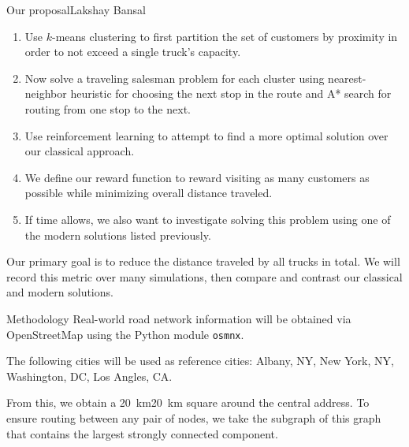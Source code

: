 \documentclass[aspectratio=169]{beamer}
\begin{document}
\begin{frame}{Our proposal\hfill\tiny Lakshay Bansal}
    \begin{enumerate}
        \item Use $k$-means clustering to first partition the set of customers by proximity in order to not exceed a single truck's capacity.
        \item Now solve a traveling salesman problem for each cluster using nearest-neighbor heuristic for choosing the next stop in the route and A* search for routing from one stop to the next.
        \item Use reinforcement learning to attempt to find a more optimal solution over our classical approach.
        \item We define our reward function to reward visiting as many customers as possible while minimizing overall distance traveled.
        \item If time allows, we also want to investigate solving this problem using one of the modern solutions listed previously.
    \end{enumerate}
    Our primary goal is to reduce the distance traveled by all trucks in total. We will record this metric over many simulations, then compare and contrast our classical and modern solutions.
\end{frame}

\begin{frame}{Methodology}
    Real-world road network information will be obtained via OpenStreetMap using the Python module \texttt{osmnx}.

    The following cities will be used as reference cities: Albany, NY, New York, NY, Washington, DC, Los Angles, CA.

    From this, we obtain a \qty{20}{\km}\times\qty{20}{\km} square around the central address. To ensure routing between any pair of nodes, we take the subgraph of this graph that contains the largest strongly connected component.
\end{frame}

\end{document}
